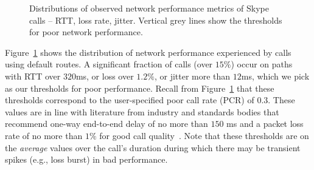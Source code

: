 \begin{figure}[t!]
\centering
{}
\caption{Distributions of observed network performance metrics of Skype calls -- 
RTT, loss rate, jitter. Vertical grey lines show the thresholds 
for poor network performance.}
\label{fig:perf-cdf}
\end{figure}

Figure~\ref{fig:perf-cdf} shows the distribution of network 
performance experienced by calls   using default routes. 
A significant fraction of calls (over $15\%$) occur on paths with 
RTT over $320$ms, or loss over $1.2\%$, or jitter more than 
$12$ms, which we pick as our thresholds for 
poor performance. %
Recall from Figure~\ref{fig:perf-cdf} that these thresholds 
correspond to the user-specified poor call rate (PCR) of $0.3$.
These values are in line with literature from industry 
and standards bodies that recommend one-way end-to-end 
delay of no more than $150$ ms and a packet loss rate of 
no more than $1\%$ for good call quality~\cite{cisco-voip, itu}. 
Note that these thresholds are on the {\em average} 
values over the call's duration during which there may 
be transient spikes (e.g., loss burst) in bad performance.




